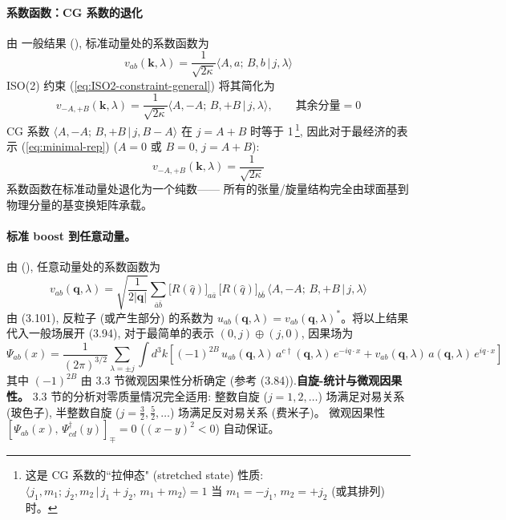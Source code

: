 \paragraph*{系数函数：CG 系数的退化}
由 一般结果 (), 标准动量处的系数函数为
\begin{equation}
    v_{ab}(\boldsymbol{k},\lambda) = \frac{1}{\sqrt{2\kappa}}
    \langle A,a;\,B,b\,|\,j,\lambda\rangle
\end{equation}
ISO(2) 约束 (\ref{eq:ISO2-constraint-general}) 将其简化为
\begin{equation}
    v_{-A,+B}(\boldsymbol{k},\lambda) = \frac{1}{\sqrt{2\kappa}}
    \langle A,-A;\,B,+B\,|\,j,\lambda\rangle, \qquad
    \text{其余分量} = 0
    \label{eq:v-massless-general}
\end{equation}
CG 系数 $\langle A,-A;\,B,+B\,|\,j,B-A\rangle$ 在 $j=A+B$ 时等于 1\,\footnote{%
这是 CG 系数的``拉伸态" (stretched state) 性质:
$\langle j_1,m_1;\,j_2,m_2\,|\,j_1+j_2,\,m_1+m_2\rangle = 1$
当 $m_1=-j_1$, $m_2=+j_2$ (或其排列) 时。},
因此对于最经济的表示 (\ref{eq:minimal-rep}) ($A=0$ 或 $B=0$, $j=A+B$):
\begin{equation}
    v_{-A,+B}(\boldsymbol{k},\lambda) = \frac{1}{\sqrt{2\kappa}}
\end{equation}
系数函数在标准动量处退化为一个纯数——
所有的张量/旋量结构完全由球面基到物理分量的基变换矩阵承载。
\paragraph*{标准 boost 到任意动量。}
由 (), 任意动量处的系数函数为
\begin{equation}
    v_{ab}(\boldsymbol{q},\lambda) = \sqrt{\frac{1}{2|\boldsymbol{q}|}}
    \sum_{\bar{a}\bar{b}}
    \bigl[R(\hat{q})\bigr]_{a\bar{a}}\,
    \bigl[R(\hat{q})\bigr]_{b\bar{b}}\,
    \langle A,-A;\,B,+B\,|\,j,\lambda\rangle
    \label{eq:v-boost-general}
\end{equation}
由 (3.101), 反粒子 (或产生部分) 的系数为
$u_{ab}(\mathbf{q},\lambda) = v_{ab}(\mathbf{q},\lambda)^*$。将以上结果代入一般场展开 (3.94), 对于最简单的表示 $(0,j)\oplus(j,0)$,
因果场为
\begin{equation}
    \Psi_{ab}(x) = \frac{1}{(2\pi)^{3/2}} \sum_{\lambda=\pm j}
    \int d^3k
    \left[(-1)^{2B}\,u_{ab}(\boldsymbol{q},\lambda)\,a^{c\dagger}(\boldsymbol{q},\lambda)\,e^{-iq\cdot x}
    + v_{ab}(\boldsymbol{q},\lambda)\,a(\boldsymbol{q},\lambda)\,e^{iq\cdot x}\right]
    \label{eq:massless-field-general}
\end{equation}
其中 $(-1)^{2B}$ 由 3.3 节微观因果性分析确定 (参考 (3.84)).\textbf{自旋-统计与微观因果性。}
3.3 节的分析对零质量情况完全适用:
整数自旋 ($j=1,2,\ldots$) 场满足对易关系 (玻色子),
半整数自旋 ($j=\frac{3}{2},\frac{5}{2},\ldots$) 场满足反对易关系 (费米子)。
微观因果性
$[\Psi_{ab}(x),\,\Psi^\dagger_{cd}(y)]_\mp = 0$ ($(x-y)^2<0$)
自动保证。
\newpage